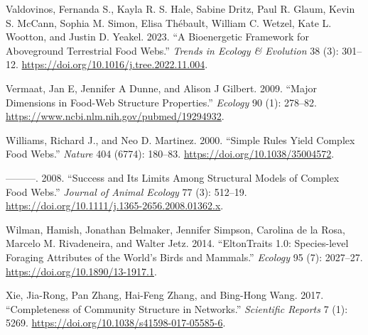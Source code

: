 \documentclass[
  letterpaper,
  DIV=11,
  numbers=noendperiod]{scrartcl}
\newlength{\cslhangindent}
\newenvironment{CSLReferences}[2] %
 {\begin{list}{}{%
  \setlength{\itemindent}{0pt}
  \setlength{\leftmargin}{0pt}
  \setlength{\parsep}{0pt}
  \ifodd #1
   \setlength{\leftmargin}{\cslhangindent}
   \setlength{\itemindent}{-1\cslhangindent}
  \fi
  \setlength{\itemsep}{#2\baselineskip}}}
 {\end{list}}
\begin{document}
\begin{CSLReferences}{1}{0}
Valdovinos, Fernanda S., Kayla R. S. Hale, Sabine Dritz, Paul R. Glaum,
Kevin S. McCann, Sophia M. Simon, Elisa Thébault, William C. Wetzel,
Kate L. Wootton, and Justin D. Yeakel. 2023. {``A Bioenergetic Framework
for Aboveground Terrestrial Food Webs.''} \emph{Trends in Ecology \&
Evolution} 38 (3): 301--12.
\url{https://doi.org/10.1016/j.tree.2022.11.004}.

Vermaat, Jan E, Jennifer A Dunne, and Alison J Gilbert. 2009. {``Major
Dimensions in Food-Web Structure Properties.''} \emph{Ecology} 90 (1):
278--82. \url{https://www.ncbi.nlm.nih.gov/pubmed/19294932}.

Williams, Richard J., and Neo D. Martinez. 2000. {``Simple Rules Yield
Complex Food Webs.''} \emph{Nature} 404 (6774): 180--83.
\url{https://doi.org/10.1038/35004572}.

---------. 2008. {``Success and Its Limits Among Structural Models of
Complex Food Webs.''} \emph{Journal of Animal Ecology} 77 (3): 512--19.
\url{https://doi.org/10.1111/j.1365-2656.2008.01362.x}.

Wilman, Hamish, Jonathan Belmaker, Jennifer Simpson, Carolina de la
Rosa, Marcelo M. Rivadeneira, and Walter Jetz. 2014. {``{EltonTraits}
1.0: {Species-level} Foraging Attributes of the World's Birds and
Mammals.''} \emph{Ecology} 95 (7): 2027--27.
\url{https://doi.org/10.1890/13-1917.1}.

Xie, Jia-Rong, Pan Zhang, Hai-Feng Zhang, and Bing-Hong Wang. 2017.
{``Completeness of {Community Structure} in {Networks}.''}
\emph{Scientific Reports} 7 (1): 5269.
\url{https://doi.org/10.1038/s41598-017-05585-6}.

\end{CSLReferences}
\end{document}
